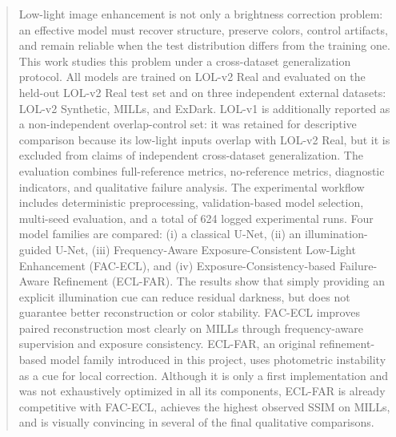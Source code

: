 \begin{abstract}
	Low-light image enhancement is not only a brightness correction problem: an effective model must recover structure, preserve colors, control artifacts, and remain reliable when the test distribution differs from the training one. This work studies this problem under a cross-dataset generalization protocol. All models are trained on LOL-v2 Real and evaluated on the held-out LOL-v2 Real test set and on three independent external datasets: LOL-v2 Synthetic, MILLs, and ExDark. LOL-v1 is additionally reported as a non-independent overlap-control set: it was retained for descriptive comparison because its low-light inputs overlap with LOL-v2 Real, but it is excluded from claims of independent cross-dataset generalization. The evaluation combines full-reference metrics, no-reference metrics, diagnostic indicators, and qualitative failure analysis. The experimental workflow includes deterministic preprocessing, validation-based model selection, multi-seed evaluation, and a total of 624 logged experimental runs. Four model families are compared: (i) a classical U-Net, (ii) an illumination-guided U-Net, (iii) Frequency-Aware Exposure-Consistent Low-Light Enhancement (FAC-ECL), and (iv) Exposure-Consistency-based Failure-Aware Refinement (ECL-FAR). The results show that simply providing an explicit illumination cue can reduce residual darkness, but does not guarantee better reconstruction or color stability. FAC-ECL improves paired reconstruction most clearly on MILLs through frequency-aware supervision and exposure consistency. ECL-FAR, an original refinement-based model family introduced in this project, uses photometric instability as a cue for local correction. Although it is only a first implementation and was not exhaustively optimized in all its components, ECL-FAR is already competitive with FAC-ECL, achieves the highest observed SSIM on MILLs, and is visually convincing in several of the final qualitative comparisons.
\end{abstract}